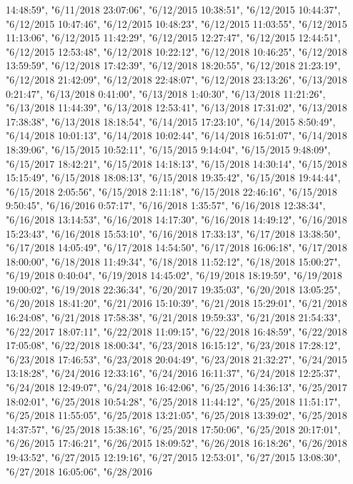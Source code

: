 \documentclass[]{article}
\begin{document}
\begin{itemize}
  14:48:59", "6/11/2018 23:07:06", "6/12/2015 10:38:51", "6/12/2015
  10:44:37", "6/12/2015 10:47:46", "6/12/2015 10:48:23", "6/12/2015
  11:03:55", "6/12/2015 11:13:06", "6/12/2015 11:42:29", "6/12/2015
  12:27:47", "6/12/2015 12:44:51", "6/12/2015 12:53:48", "6/12/2018
  10:22:12", "6/12/2018 10:46:25", "6/12/2018 13:59:59", "6/12/2018
  17:42:39", "6/12/2018 18:20:55", "6/12/2018 21:23:19", "6/12/2018
  21:42:09", "6/12/2018 22:48:07", "6/12/2018 23:13:26", "6/13/2018
  0:21:47", "6/13/2018 0:41:00", "6/13/2018 1:40:30", "6/13/2018
  11:21:26", "6/13/2018 11:44:39", "6/13/2018 12:53:41", "6/13/2018
  17:31:02", "6/13/2018 17:38:38", "6/13/2018 18:18:54", "6/14/2015
  17:23:10", "6/14/2015 8:50:49", "6/14/2018 10:01:13", "6/14/2018
  10:02:44", "6/14/2018 16:51:07", "6/14/2018 18:39:06", "6/15/2015
  10:52:11", "6/15/2015 9:14:04", "6/15/2015 9:48:09", "6/15/2017
  18:42:21", "6/15/2018 14:18:13", "6/15/2018 14:30:14", "6/15/2018
  15:15:49", "6/15/2018 18:08:13", "6/15/2018 19:35:42", "6/15/2018
  19:44:44", "6/15/2018 2:05:56", "6/15/2018 2:11:18", "6/15/2018
  22:46:16", "6/15/2018 9:50:45", "6/16/2016 0:57:17", "6/16/2018
  1:35:57", "6/16/2018 12:38:34", "6/16/2018 13:14:53", "6/16/2018
  14:17:30", "6/16/2018 14:49:12", "6/16/2018 15:23:43", "6/16/2018
  15:53:10", "6/16/2018 17:33:13", "6/17/2018 13:38:50", "6/17/2018
  14:05:49", "6/17/2018 14:54:50", "6/17/2018 16:06:18", "6/17/2018
  18:00:00", "6/18/2018 11:49:34", "6/18/2018 11:52:12", "6/18/2018
  15:00:27", "6/19/2018 0:40:04", "6/19/2018 14:45:02", "6/19/2018
  18:19:59", "6/19/2018 19:00:02", "6/19/2018 22:36:34", "6/20/2017
  19:35:03", "6/20/2018 13:05:25", "6/20/2018 18:41:20", "6/21/2016
  15:10:39", "6/21/2018 15:29:01", "6/21/2018 16:24:08", "6/21/2018
  17:58:38", "6/21/2018 19:59:33", "6/21/2018 21:54:33", "6/22/2017
  18:07:11", "6/22/2018 11:09:15", "6/22/2018 16:48:59", "6/22/2018
  17:05:08", "6/22/2018 18:00:34", "6/23/2018 16:15:12", "6/23/2018
  17:28:12", "6/23/2018 17:46:53", "6/23/2018 20:04:49", "6/23/2018
  21:32:27", "6/24/2015 13:18:28", "6/24/2016 12:33:16", "6/24/2016
  16:11:37", "6/24/2018 12:25:37", "6/24/2018 12:49:07", "6/24/2018
  16:42:06", "6/25/2016 14:36:13", "6/25/2017 18:02:01", "6/25/2018
  10:54:28", "6/25/2018 11:44:12", "6/25/2018 11:51:17", "6/25/2018
  11:55:05", "6/25/2018 13:21:05", "6/25/2018 13:39:02", "6/25/2018
  14:37:57", "6/25/2018 15:38:16", "6/25/2018 17:50:06", "6/25/2018
  20:17:01", "6/26/2015 17:46:21", "6/26/2015 18:09:52", "6/26/2018
  16:18:26", "6/26/2018 19:43:52", "6/27/2015 12:19:16", "6/27/2015
  12:53:01", "6/27/2015 13:08:30", "6/27/2018 16:05:06", "6/28/2016

\end{itemize}
\end{document}
